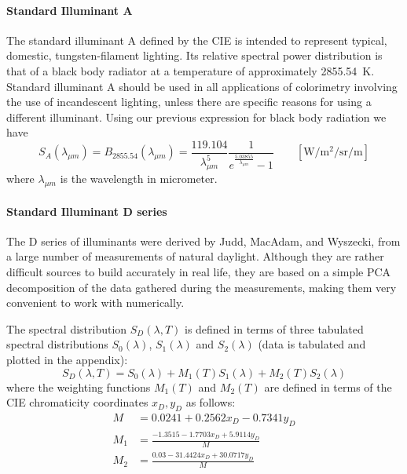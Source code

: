 \paragraph{Standard Illuminant A}

The standard illuminant A defined by the \gls{CIE} is intended to
represent typical, domestic, tungsten-filament lighting.
Its relative spectral power distribution is that of a black body radiator at a
temperature of approximately \SI{2855.54}{\kelvin}.
Standard illuminant A should be used in all applications of colorimetry
involving the use of incandescent lighting, unless there are specific reasons
for
using a different illuminant. Using our previous expression for black body radiation we have
\begin{equation}
S_{A}(\lambda_{\mu m}) = B_{2855.54}(\lambda_{\mu m}) =
\frac{119.104}{\lambda_{\mu m}^5} \frac 1{e^{\frac{5.03855}{\lambda_{\mu m}}}-1}
\qquad \left[\si{\watt\per\square\meter\per\steradian\per\meter}\right]
\end{equation}
where $\lambda_{\mu m}$ is the wavelength in micrometer.

\paragraph{Standard Illuminant D series}

The D series of illuminants were derived by Judd, MacAdam, and Wyszecki, from a
large number of measurements of natural daylight. Although they are rather
difficult sources to build accurately in real life, they are based on a simple
PCA decomposition of the data gathered during the measurements, making them
very convenient to work with numerically.

The spectral distribution $S_D(\lambda, T)$ is defined in terms of three tabulated spectral
distributions $S_0(\lambda)$, $S_1(\lambda)$ and $S_2(\lambda)$ (data is tabulated
and plotted in the appendix):
\begin{equation}
S_D(\lambda, T) = S_0(\lambda) + M_1(T) S_1(\lambda) + M_2(T) S_2(\lambda)
\end{equation}
where the weighting functions $M_1(T)$ and $M_2(T)$ are defined in terms of the
\gls{CIE} chromaticity coordinates $x_D, y_D$ as follows:
\begin{align*}
M   &= 0.0241 + 0.2562 x_D - 0.7341 y_D \\
M_1 &= \frac{-1.3515 - 1.7703 x_D + 5.9114 y_D}{M} \\
M_2 &= \frac{0.03 - 31.4424 x_D + 30.0717 y_D}{M} \\
\end{align*}

